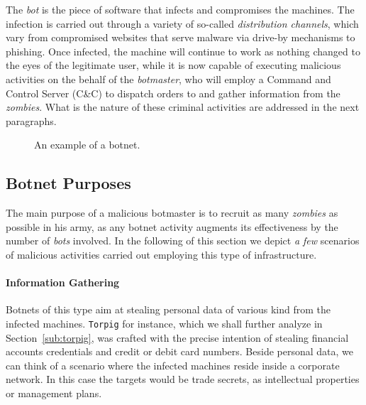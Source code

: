 The \emph{bot} is the piece of software that infects and compromises the machines.
The infection is carried out through a variety of so-called \emph{distribution channels}, which vary from compromised websites that serve malware via drive-by
mechanisms to phishing.
Once infected, the machine will continue to work as nothing changed to the eyes
of the legitimate user, while it is now capable of executing malicious
activities on the behalf of the \emph{botmaster}, who will employ a Command and
Control Server (C\&C) to dispatch orders to and gather information from
the \emph{zombies}. What is the nature of these criminal activities are
addressed in the next paragraphs.

\begin{figure}[!htp]
\centering
{}
\caption{An example of a botnet.}
\label{fig:botnet_example}
\end{figure}

\subsection{Botnet Purposes} %
\label{sub:purposes}
The main purpose of a malicious botmaster is to recruit as many \emph{zombies} as possible
in his army, as any botnet activity augments its effectiveness by the number
of \emph{bots} involved. In the following of this section we depict \emph{a few}
scenarios of malicious activities carried out employing this type of infrastructure.

\paragraph{Information Gathering} Botnets of this type aim at stealing personal
data of various kind from the infected machines. \texttt{Torpig} for instance,
which we shall further analyze in Section~\ref{sub:torpig}, was crafted with the precise
intention of stealing financial accounts credentials and credit or debit card
numbers. Beside personal data, we can think of a scenario where the infected
machines reside inside a corporate network. In this case the targets would be
trade secrets, as intellectual properties or management plans.

